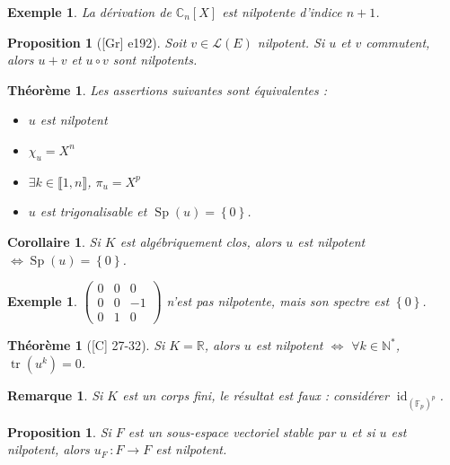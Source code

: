 \documentclass[10pt, a4paper, parskip=full, twoside, twocolumn]{report}
\newtheorem{theorem}[definition]{Théorème}
\newtheorem{proposition}[definition]{Proposition}
\newtheorem{corollary}[definition]{Corollaire}
\newtheorem{example}[definition]{Exemple}
\newtheorem{remark}[definition]{Remarque}
\newcommand{\IN}{\mathbb{N}}
\newcommand{\IC}{\mathbb{C}}
\newcommand{\IF}{\mathbb{F}}
\newcommand{\IR}{\mathbb{R}}
\DeclareMathOperator{\id}{id}
\DeclareMathOperator{\tr}{tr}
\DeclareMathOperator{\Sp}{Sp}
\begin{document}
\begin{example}
	La dérivation de $\IC_n[X]$ est nilpotente d'indice $n+1$.
\end{example}

\begin{proposition}[\textnormal{[Gr] e192}]
	Soit $v\in\mathcal{L}(E)$ nilpotent. Si $u$ et $v$ commutent, alors $u+v$ et $u\circ v$ sont nilpotents.
\end{proposition}

\begin{theorem}
	Les assertions suivantes sont équivalentes :
	\begin{itemize}
		\item $u$ est nilpotent
		\item $\chi_u = X^n$
		\item $\exists k\in \llbracket 1,n\rrbracket$, $\pi_u = X^p$
		\item $u$ est trigonalisable et $\Sp(u) = \left\{0\right\}$.
	\end{itemize}
\end{theorem}

\begin{corollary}
	Si $K$ est algébriquement clos, alors $u$ est nilpotent $\iff \Sp(u)=\left\{0\right\}$. 
\end{corollary}

\begin{example}
	$\left(\begin{smallmatrix}
		0&0&0\\ 0&0&-1 \\ 0&1&0
	\end{smallmatrix}\right)$ n'est pas nilpotente, mais son spectre est $\left\{0\right\}$.
\end{example}

\begin{theorem}[\textnormal{[C] 27-32}]
	Si $K=\IR$, alors $u$ est nilpotent $\iff$ $\forall k\in \IN^*$, $\tr(u^k) = 0$.
\end{theorem}

\begin{remark}
	Si $K$ est un corps fini, le résultat est faux : considérer $\id_{\left(\IF_p\right)^p}$.
\end{remark}

\begin{proposition}
	Si $F$ est un sous-espace vectoriel stable par $u$ et si $u$ est nilpotent, alors $u_F\,\colon F\to F$ est nilpotent.
\end{proposition}
\end{document}
